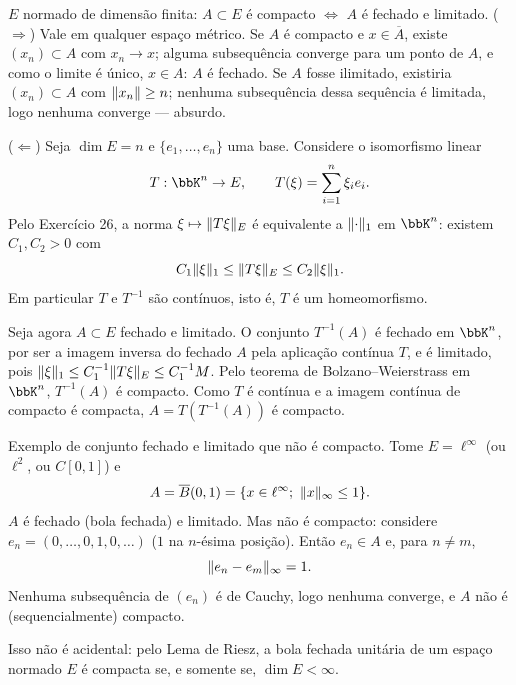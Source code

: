 \begin{exercicio}{$E$ normado de dimensão finita: $A\subset E$ é compacto $\iff$ $A$ é fechado e limitado.}
\sol
($\Rightarrow$) Vale em qualquer espaço métrico. Se $A$ é compacto e $x\in\overline{A}$, existe $(x_n)\subset A$ com $x_n\to x$; alguma subsequência converge para um ponto de $A$, e como o limite é único, $x\in A$: $A$ é fechado. Se $A$ fosse ilimitado, existiria $(x_n)\subset A$ com $\lVert x_n\rVert\ge n$; nenhuma subsequência dessa sequência é limitada, logo nenhuma converge --- absurdo.

($\Leftarrow$) Seja $\dim E=n$ e $\{e_1,\dots,e_n\}$ uma base. Considere o isomorfismo linear
\[ T:\bbK^n\to E,\qquad T(\xi)=\sum_{i=1}^{n}\xi_ie_i. \]
Pelo Exercício 26, a norma $\xi\mapsto\lVert T\xi\rVert_E$ é equivalente a $\lVert\cdot\rVert_1$ em $\bbK^n$: existem $C_1,C_2>0$ com
\[ C_1\lVert\xi\rVert_1\le\lVert T\xi\rVert_E\le C_2\lVert\xi\rVert_1 . \]
Em particular $T$ e $T^{-1}$ são contínuos, isto é, $T$ é um homeomorfismo.

Seja agora $A\subset E$ fechado e limitado. O conjunto $T^{-1}(A)$ é fechado em $\bbK^n$, por ser a imagem inversa do fechado $A$ pela aplicação contínua $T$, e é limitado, pois $\lVert\xi\rVert_1\le C_1^{-1}\lVert T\xi\rVert_E\le C_1^{-1}M$. Pelo teorema de Bolzano--Weierstrass em $\bbK^n$, $T^{-1}(A)$ é compacto. Como $T$ é contínua e a imagem contínua de compacto é compacta, $A=T(T^{-1}(A))$ é compacto.
\end{exercicio}

\begin{exercicio}{Exemplo de conjunto fechado e limitado que não é compacto.}
\sol
Tome $E=\ell^\infty$ (ou $\ell^2$, ou $C[0,1]$) e
\[ A=\overline{B}(0,1)=\{x\in \ell^\infty;\ \norm{x}_\infty\le1\}. \]
$A$ é fechado (bola fechada) e limitado. Mas não é compacto: considere $e_n=(0,\dots,0,1,0,\dots)$ ($1$ na $n$-ésima posição). Então $e_n\in A$ e, para $n\neq m$,
\[ \lVert e_n-e_m\rVert_\infty=1 . \]
Nenhuma subsequência de $(e_n)$ é de Cauchy, logo nenhuma converge, e $A$ não é (sequencialmente) compacto.

\begin{obs}
Isso não é acidental: pelo Lema de Riesz, a bola fechada unitária de um espaço normado $E$ é compacta se, e somente se, $\dim E<\infty$.
\end{obs}
\end{exercicio}

